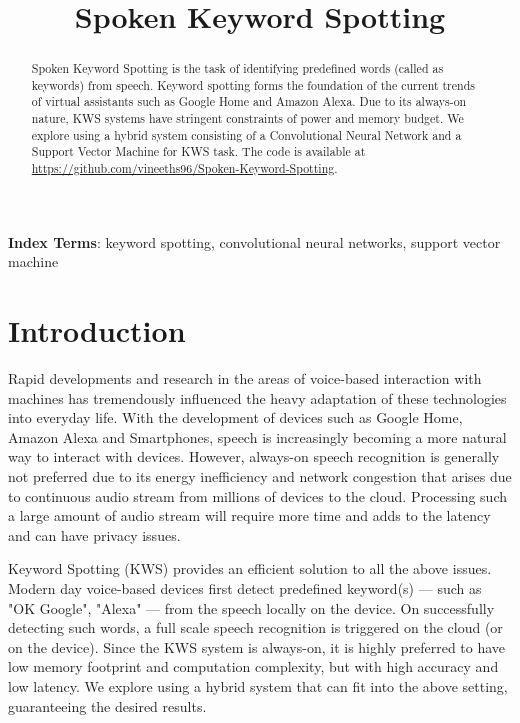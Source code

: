 \documentclass[a4paper]{article}
\title{Spoken Keyword Spotting}
\begin{document}
\maketitle

\begin{abstract}

Spoken Keyword Spotting is the task of identifying predefined words (called as keywords) from speech. Keyword spotting forms the foundation of the current trends of virtual assistants such as Google Home and Amazon Alexa. Due to its always-on nature, KWS systems have stringent constraints of power and memory budget. We explore using a hybrid system consisting of a Convolutional Neural Network and a Support Vector Machine for KWS task. The code is available at  \url{https://github.com/vineeths96/Spoken-Keyword-Spotting}.

\end{abstract}
\noindent\textbf{Index Terms}: keyword spotting, convolutional neural networks, support vector machine


\section{Introduction}

Rapid developments and research in the areas of voice-based interaction with machines has tremendously influenced the heavy adaptation of these technologies into everyday life. With the development of devices such as Google Home, Amazon Alexa and Smartphones, speech is increasingly becoming a more natural way to interact with devices. However, always-on speech recognition is generally not preferred due to its energy inefficiency and network congestion that arises due to continuous audio stream from millions of devices to the cloud. Processing such a large amount of audio stream will require more time and adds to the latency and can have privacy issues.

Keyword Spotting (KWS) provides an efficient solution to all the above issues. Modern day voice-based devices first detect predefined keyword(s) --- such as "OK Google", "Alexa" --- from the speech locally on the device. On successfully detecting such words, a full scale speech recognition is triggered on the cloud (or on the device). Since the KWS system is always-on, it is highly preferred to have low memory footprint and computation complexity, but with high accuracy and low latency. We explore using a hybrid system that can fit into the above setting, guaranteeing the desired results.
\end{document}
